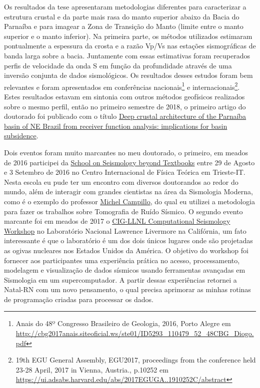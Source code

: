\documentclass[10pt,a4paper,oneside]{book}
\begin{document}
Os resultados da tese apresentaram metodologias diferentes para caracterizar a estrutura crustal e da parte mais rasa do manto superior abaixo da Bacia do Parnaíba e para imagear a Zona de Transição do Manto (limite entre o manto superior e o manto inferior). Na primeira parte, os métodos utilizados estimaram pontualmente a espessura da crosta e a razão Vp/Vs nas estações sismográficas de banda larga sobre a bacia. Juntamente com essas estimativas foram recuperados perfis de velocidade da onda S em função da profundidade através de uma inversão conjunta de dados sismológicos. Os resultados desses estudos foram bem relevantes e foram apresentados em conferências nacionais\footnote{Anais do 48º Congresso Brasileiro de Geologia, 2016, Porto Alegre em \url{http://cbg2017anais.siteoficial.ws/ste01/ID5293_110479_52_48CBG_Diogo.pdf}} e internacionais\footnote{19th EGU General Assembly, EGU2017, proceedings from the conference held 23-28 April, 2017 in Vienna, Austria., p.10252 em \url{https://ui.adsabs.harvard.edu/abs/2017EGUGA..1910252C/abstract}}. Estes resultados estavam em sintonia com outros métodos geofísicos realizados sobre o mesmo perfil, então no primeiro semestre de 2018, o primeiro artigo do doutorado foi publicado com o título \href{https://doi.org/10.1144/SP472.8}{Deep crustal architecture of the Parnaíba basin of NE Brazil from receiver function analysis: implications for basin subsidence}.

Dois eventos foram muito marcantes no meu doutorado, o primeiro, em meados de 2016 participei da \href{https://indico.ictp.it/event/7615/material/11/0.jpg}{School on Seismology beyond Textbooks} entre 29 de Agosto e 3 Setembro de 2016 no Centro Internacional de Física Teórica em Trieste-IT. Nesta escola eu pude ter um encontro com diversos doutorandos ao redor do mundo, além de interagir com grandes cientistas na área da Sismologia Moderna, como é o exemplo do professor \href{https://scholar.google.fr/citations?user=ZCRP01AAAAAJ&hl=fr}{Michel Campillo}, do qual eu utilizei a metodologia para fazer os trabalhos sobre Tomografia de Ruído Sísmico. O segundo evento marcante foi em meados de 2017 o \href{https://geodynamics.org/events/details/218}{CIG-LLNL Computational Seismology Workshop} no Laboratório Nacional Lawrence Livermore na Califórnia, um fato interessante é que o laboratório é um dos dois únicos lugares onde são projetadas as ogivas nucleares nos Estados Unidos da América. O objetivo do workshop foi fornecer aos participantes uma experiência prática no acesso, processamento, modelagem e visualização de dados sísmicos usando ferramentas avançadas em Sismologia em um supercomputador. A partir dessas experiências retornei a Natal-RN com um novo pensamento, o qual precisa aprimorar as minhas rotinas de programação criadas para processar os dados. 
\end{document}
